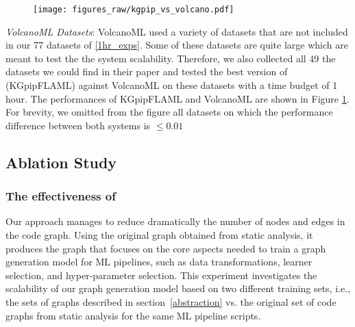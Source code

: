 \begin{figure}
\ncp\ncp
\centering
  \texttt{[image: figures\_raw/kgpip\_vs\_volcano.pdf]}
  \ncp\ncp\ncp\ncp\ncp
  \caption{}
  \label{volcanoML_exp}
\end{figure}



\textit{VolcanoML Datasets}: VolcanoML used a variety of datasets that are not included in our 77 datasets of \autoref{1hr_exps}. Some of these datasets are quite large which are meant to test the the system scalability. Therefore, we also collected all 49 the datasets we could find in their paper and tested the best version of {\sysname} (KGpipFLAML) against VolcanoML on these datasets with a time budget of 1 hour. The performances of KGpipFLAML and VolcanoML are shown in Figure \ref{volcanoML_exp}. For brevity, we omitted from the figure all datasets on which the performance difference between both systems is $\leq 0.01$  










\subsection{Ablation Study}
\label{sec:study}


\subsubsection{The effectiveness of {\GML}}
Our {\GML} approach manages to reduce dramatically the number of nodes and edges in the code graph.  Using the original graph obtained from static analysis, it produces the {\GML} graph that focuses on the core aspects needed to train a graph generation model for ML pipelines, such as data transformations, learner selection, and hyper-parameter selection. This experiment investigates the scalability of our graph generation model based on two different training sets, i.e., the sets of {\GML} graphs described in section~\ref{abstraction} vs. the original set of code graphs from static analysis for the same ML pipeline scripts. 




